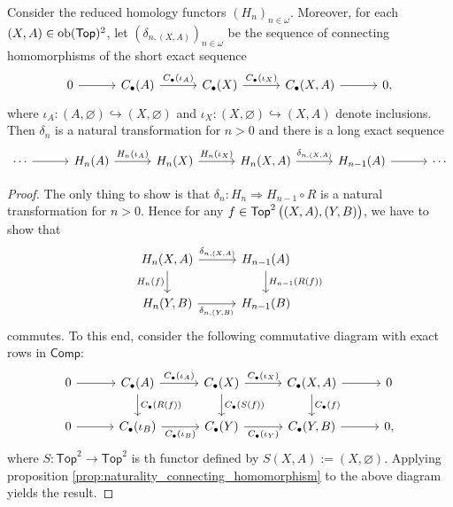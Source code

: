 \begin{corollary}
	Consider the reduced homology functors $(H_n)_{n \in \omega}$. Moreover, for each $(X,A) \in \operatorname{ob}(\mathsf{Top})^2$, let $(\delta_{n,(X,A)})_{n \in \omega}$ be the sequence of connecting homomorphisms of the short exact sequence 
	\begin{equation*}
		\begin{tikzcd}[column sep = 7ex]
			0 \arrow[r] & C_\bullet(A) \arrow[r,"C_\bullet(\iota_A)"] & C_\bullet(X) \arrow[r,"C_\bullet(\iota_X)"] & C_\bullet(X,A) \arrow[r] & 0,
		\end{tikzcd}
	\end{equation*}
	\noindent where $\iota_A : (A,\varnothing) \hookrightarrow (X,\varnothing)$ and $\iota_X : (X,\varnothing) \hookrightarrow (X,A)$ denote inclusions. Then $\delta_n$ is a natural transformation for $n > 0$ and there is a long exact sequence
\begin{equation*}
	\begin{tikzcd}[column sep=7ex]
	\cdots \arrow[r] & H_n(A) \arrow[r,"H_n(\iota_A)"] & H_n(X) \arrow[r,"H_n(\iota_X)"] & H_n(X,A) \arrow[r,"\delta_{n,(X,A)}"] & H_{n - 1}(A) \arrow[r] & \cdots
	\end{tikzcd}
\end{equation*}

\end{corollary}

\begin{proof}
	The only thing to show is that $\delta_n : H_n \Rightarrow H_{n - 1} \circ R$ is a natural transformation for $n > 0$. Hence for any $f \in \mathsf{Top}^2\del[1]{(X,A),(Y,B)}$, we have to show that
	\begin{equation*}
		\begin{tikzcd}[column sep=7ex]
			H_n(X,A) \arrow[r,"\delta_{n,(X,A)}"]\arrow[d,"H_n(f)"'] & H_{n - 1}(A)\arrow[d,"H_{n-1}(R(f))"]\\
			H_n(Y,B) \arrow[r,"\delta_{n,(Y,B)}"']& H_{n - 1}(B)
		\end{tikzcd}
	\end{equation*}
	\noindent commutes. To this end, consider the following commutative diagram with exact rows in $\mathsf{Comp}$: 
	\begin{equation*}
		\begin{tikzcd}[column sep=7ex]
			0 \arrow[r] & C_\bullet(A) \arrow[r,"C_\bullet(\iota_A)"]\arrow[d,"C_\bullet(R(f))"] & C_\bullet(X) \arrow[r,"C_\bullet(\iota_X)"]\arrow[d,"C_\bullet(S(f))"] & C_\bullet(X,A) \arrow[r]\arrow[d,"C_\bullet(f)"] & 0\\
			0 \arrow[r] & C_\bullet(\iota_B) \arrow[r,"C_\bullet(\iota_B)"'] & C_\bullet(Y) \arrow[r,"C_\bullet(\iota_Y)"'] & C_\bullet(Y,B) \arrow[r] & 0,
		\end{tikzcd}
	\end{equation*}
	\noindent where $S : \mathsf{Top}^2 \to \mathsf{Top}^2$ is th functor defined by $S(X,A) := (X,\varnothing)$. Applying proposition \ref{prop:naturality_connecting_homomorphism} to the above diagram yields the result.
\end{proof}
